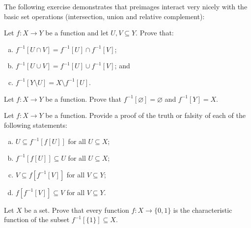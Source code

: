 The following exercise demonstrates that preimages interact very nicely with the basic set operations (intersection, union and relative complement):
\begin{exercise}
Let $f : X \to Y$ be a function and let $U, V \subseteq Y$. Prove that:
\begin{enumerate}[(a)]
\item $f^{-1}[U \cap V] = f^{-1}[U] \cap f^{-1}[V]$;
\item $f^{-1}[U \cup V] = f^{-1}[U] \cup f^{-1}[V]$; and
\item $f^{-1}[Y \setminus U] = X \setminus f^{-1}[U]$.
\end{enumerate}
\end{exercise}

\begin{exercise}
Let $f : X \to Y$ be a function. Prove that $f^{-1}[\varnothing] = \varnothing$ and $f^{-1}[Y]=X$.
\end{exercise}

\begin{exercise}
Let $f : X \to Y$ be a function. Provide a proof of the truth or falsity of each of the following statements:
\begin{enumerate}[(a)]
\item $U \subseteq f^{-1}[f[U]]$ for all $U \subseteq X$;
\item $f^{-1}[f[U]] \subseteq U$ for all $U \subseteq X$;
\item $V \subseteq f[f^{-1}[V]]$ for all $V \subseteq Y$;
\item $f[f^{-1}[V]] \subseteq V$ for all $V \subseteq Y$.
\end{enumerate}
\end{exercise}

\begin{exercise}
\label{exCharacteristicFunctionsCorrespondWithSubsets}
Let $X$ be a set. Prove that every function $f : X \to \{0,1\}$ is the characteristic function of the subset $f^{-1}[\{1\}] \subseteq X$.
\end{exercise}

